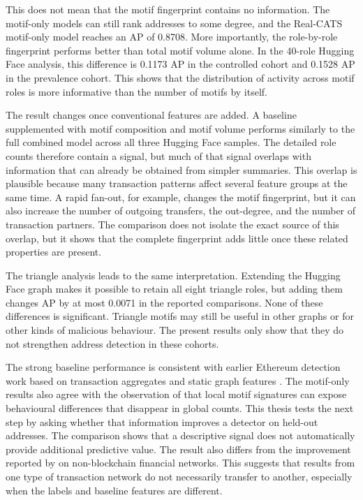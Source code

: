 \documentclass{thesisclass}
\begin{document}
This does not mean that the motif fingerprint contains no information. The
motif-only models can still rank addresses to some degree, and the Real-CATS
motif-only model reaches an AP of 0.8708. More importantly, the
role-by-role fingerprint performs better than total motif volume alone. In the
40-role Hugging Face analysis, this difference is 0.1173 AP in the controlled
cohort and 0.1528 AP in the prevalence cohort. This shows that the distribution
of activity across motif roles is more informative than the number of motifs by
itself.

The result changes once conventional features are added. A baseline supplemented
with motif composition and motif volume performs similarly to the full combined
model across all three Hugging Face samples. The detailed role counts therefore
contain a signal,
but much of that signal overlaps with information that can already be obtained
from simpler summaries. This overlap is plausible because many transaction
patterns affect several feature groups at the same time. A rapid fan-out, for
example, changes the motif fingerprint, but it can also increase the number of
outgoing transfers, the out-degree, and the number of transaction partners. The
comparison does not isolate the exact source of this overlap, but it shows that
the complete fingerprint adds little once these related properties are present.

The triangle analysis leads to the same interpretation. Extending the
Hugging Face graph makes it possible to retain all eight triangle roles, but
adding them changes AP by at most 0.0071 in the reported comparisons. None of
these differences is significant. Triangle motifs may still be useful in other
graphs or for other kinds of malicious behaviour. The present results only show
that they do not strengthen address detection in these cohorts.

The strong baseline performance is consistent with earlier Ethereum detection
work based on transaction aggregates and static graph features
\citep{chen2022phishing, sanjalawe2023atd}. The motif-only results also agree
with the observation of \citet{arnold2024motifs} that local motif signatures can
expose behavioural differences that disappear in global counts. This thesis
tests the next step by asking whether that information improves a detector on
held-out addresses. The comparison shows that a descriptive signal does not
automatically provide additional predictive value. The result
also differs from the improvement reported by \citet{liu2023temporal} on
non-blockchain financial networks. This suggests that results from one type of
transaction network do not necessarily transfer to another, especially when
the labels and baseline features are different.
\end{document}
